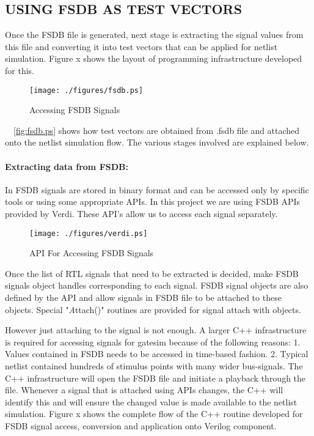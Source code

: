 \subsection{USING FSDB AS TEST VECTORS}
Once the FSDB file is generated, next stage is extracting the signal values from this file and converting it into test vectors that can be applied for netlist simulation. Figure x shows the layout of programming infrastructure developed for this.

\begin{figure}[H]
\centering
\texttt{[image: ./figures/fsdb.ps]}
\caption{Accessing FSDB Signals}
\label{fig:fsdb.eps}
\end{figure}

~\figurename{~\ref{fig:fsdb.ps}} shows how test vectors are obtained from .fsdb file and attached onto the netlist simulation flow. The various stages involved are explained below.

\paragraph{Extracting data from FSDB:}In FSDB signals are stored in binary format and can be accessed only by specific tools or using some appropriate APIs.  In this project we are using FSDB APIs provided by Verdi. These API's allow us to access each signal separately. 


\begin{figure}[H]
\centering
\texttt{[image: ./figures/verdi.ps]}
\caption{API For Accessing FSDB Signals}
\label{fig:verdi.eps}
\end{figure}






Once the list of RTL signals that need to be extracted is decided, make FSDB signals object handles corresponding to each signal. FSDB signal objects are also defined by the API and allow signals in FSDB file to be attached to these objects. Special "{\emph Attach()}" routines are provided for signal attach with objects.

However just attaching to the signal is not enough. A larger C++ infrastructure is required for accessing signals for gatesim because of the following reasons:
1.	Values contained in FSDB needs to be accessed in time-based fashion.
2.	Typical netlist contained hundreds of stimulus points with many wider bus-signals.
The C++ infrastructure will open the FSDB file and initiate a playback through the file. Whenever a signal that is attached using APIs changes, the C++ will identify this and will ensure the changed value is made available to the netlist simulation.  Figure x shows the complete flow of the C++ routine developed for FSDB signal access, conversion and application onto Verilog component.


